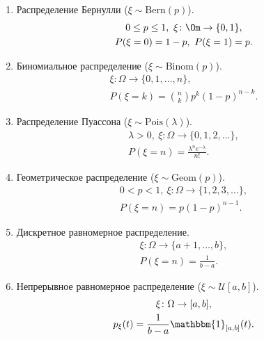  \begin{examples}
 \enewline
     \begin{enumerate}
         \item Распределение Бернулли ($\xi\sim \text{Bern}(p)$).
                \begin{gather*}
                    0\le p\le 1, \ \xi \colon \Om \to \{0, 1\},  \\
                    P(\xi = 0) = 1 - p,\ P(\xi = 1) = p.
                \end{gather*}

         \item Биномиальное распределение ($\xi\sim \text{Binom}(p)$).
         \begin{gather*}
             \xi \colon \Omega \rightarrow \{0,1, \ldots, n\}, \\
             P(\xi = k) = \binom{n}{k}p^k(1-p)^{n - k}.
         \end{gather*}

         \item Распределение Пуассона ($\xi \sim \text{Pois}(\lambda)$).
         \begin{gather*}
             \lambda > 0, \ \xi \colon \Omega\rightarrow\{0, 1, 2, \ldots\},\\
             P(\xi = n) = \frac{\lambda^n e^{-\lambda}}{n!}.
         \end{gather*}
    

         \item Геометрическое распределение ($\xi\sim \text{Geom}(p)$).
         \begin{gather*}
             0< p < 1, \ \xi \colon \Omega\rightarrow \{1, 2, 3, \ldots\}, \\
             P(\xi = n) = p(1-p)^{n - 1}.
         \end{gather*}

         \item Дискретное равномерное распределение.
         \begin{gather*}
             \xi \colon \Omega\rightarrow \{a+1, \ldots, b\},\\
             P(\xi = n) = \frac{1}{b - a}.
         \end{gather*}
    
         \item Непрерывное равномерное распределение ($\xi \sim \mathcal{U}[a, b]$).
         \begin{gather*}
             \xi \colon \Omega\rightarrow [a, b],\\
             p_\xi (t) = \frac{1}{b - a}\mathbbm{1}_{[a, b]}(t).
         \end{gather*}


\end{enumerate}
\end{examples}

